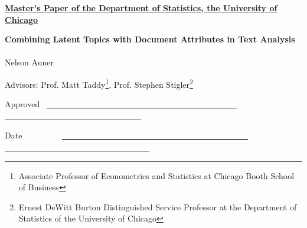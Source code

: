 \documentclass[12pt]{article}
\begin{document}
\noindent
\thispagestyle{empty}
\underline{\bf Master's Paper of the Department of Statistics, the
  University of Chicago} 


\vspace{1.8in}
\begin{center}
{\bf\LARGE Combining Latent
Topics with Document Attributes in Text Analysis} \\~\\


\vspace{1.4in}
{\Large Nelson Auner}

\vspace{1.3in}
{\Large Advisors: Prof. Matt Taddy\footnote{Associate Professor of Econometrics and Statistics at Chicago Booth School of Business}, Prof. Stephen Stigler\footnote{Ernest DeWitt Burton Distinguished Service Professor at the Department of Statistics of the University of Chicago} \\{\small }}

\end{center}

\vspace{.6in}
{\Large Approved} ~\underline{~~~~~~~~~~~~~~~~~~~~~~~~~~~~~~~~~~~~~~~~~~~~~~
~~~~~~~~~~~~~~~~~~~~~~~~~~~~~~~~~}

\vspace{.2in}
{\Large Date} ~~~~~~~~~\underline{~~~~~~~~~~~~~~~~~~~~~~~~~~~~~~~~~~~~~~~~~~~~~
~~~~~~~~~~~~~~~~~~~~~~~~~~~~~~~~~~~}


\newpage
\pagestyle{plain}
\setcounter{page}{1}

\begin{abstract}

\vspace{7mm}\noindent 

This paper introduces a variant to existing models of multinomial
regression for text analysis. Using the base model introduced by Taddy
(2013a), we extend the data-generating model to incorporate topics not
explained by metadata. In doing so, we seek to increase
the prediction accuracy over existing techniques, bridge the gap between
multinomial regression and standard topic models, and investigate
methods for discovering new topics in a corpus. We explore computational
aspects of our approach, provide software for parallelization of the
algorithm, and conclude by proposing areas of future research.

\end{abstract}
\end{document}
